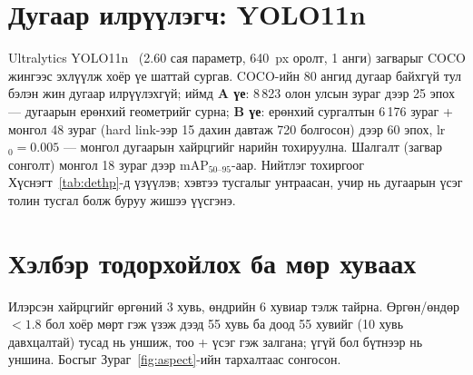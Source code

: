\section{Дугаар илрүүлэгч: YOLO11n}
Ultralytics YOLO11n~\cite{yolo11} (2.60 сая параметр, 640~px оролт, 1 анги) загварыг COCO жингээс эхлүүлж хоёр үе шаттай сургав. COCO-ийн 80 ангид дугаар байхгүй тул бэлэн жин дугаар илрүүлэхгүй; иймд \textbf{A үе}: 8\,823 олон улсын зураг дээр 25 эпох --- дугаарын ерөнхий геометрийг сурна; \textbf{B үе}: ерөнхий сургалтын 6\,176 зураг + монгол 48 зураг (hard link-ээр 15 дахин давтаж 720 болгосон) дээр 60 эпох, lr$_0=0.005$ --- монгол дугаарын хайрцгийг нарийн тохируулна. Шалгалт (загвар сонголт) монгол 18 зураг дээр mAP$_{50\text{--}95}$-аар. Нийтлэг тохиргоог Хүснэгт~\ref{tab:dethp}-д үзүүлэв; хэвтээ тусгалыг унтраасан, учир нь дугаарын үсэг толин тусгал болж буруу жишээ үүсгэнэ.
\begin{table}[H]\centering\caption{YOLO11n илрүүлэгчийн сургалтын тохиргоо}\label{tab:dethp}\small
{}\end{table}

\section{Хэлбэр тодорхойлох ба мөр хуваах}
Илэрсэн хайрцгийг өргөний 3 хувь, өндрийн 6 хувиар тэлж тайрна. Өргөн/өндөр $<1.8$ бол хоёр мөрт гэж үзэж дээд 55 хувь ба доод 55 хувийг (10 хувь давхцалтай) тусад нь уншиж, тоо + үсэг гэж залгана; үгүй бол бүтнээр нь уншина. Босгыг Зураг~\ref{fig:aspect}-ийн тархалтаас сонгосон.


